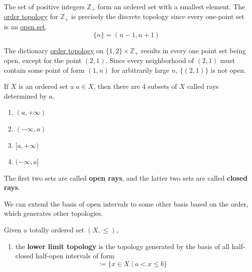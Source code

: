   \begin{example}
    \label{ex:positive-integers}
    The set of positive integers $\mathbb{Z}_+$ form an ordered set with a smallest element. The \hyperref[def:order-topology]{order topology} for $\mathbb{Z}_+$ is precisely the discrete topology since every one-point set is an \hyperref[def:open-set]{open set}. 
    \begin{equation}
      \{n\} = (n-1, n+1)
    \end{equation}
  \end{example}

  \begin{example}
    \label{ex:two-copies-of-positive-integers}
    The dictionary \hyperref[def:order-topology]{order topology} on $\{1, 2\} \times \mathbb{Z}_+$ results in every one point set being open, except for the point $(2, 1)$. Since every neighborhood of $(2,1)$ must contain some point of form $(1, n)$ for arbitrarily large $n$, $\{(2,1)\}$ is not open. 
  \end{example}

  \begin{definition}
    \label{def:open-and-closed-rays}
    If $X$ is an ordered set a $a \in X$, then there are 4 subsets of $X$ called rays determined by $a$. 
    \begin{enumerate}
      \item $(a, +\infty)$ 
      \item $(-\infty, a)$
      \item $[a, +\infty)$
      \item $(-\infty, a]$
    \end{enumerate}
    The first two sets are called \textbf{open rays}, and the latter two sets are called \textbf{closed rays}. 
  \end{definition}

  We can extend the basis of open intervals to some other basis based on the order, which generates other topologies. 

  \begin{example}
    \label{ex:lower-upper-limit-topology}
    Given a totally ordered set $(X, \leq)$, 
    \begin{enumerate}
      \item the \textbf{lower limit topology} is the topology generated by the basis of all half-closed half-open intervals of form 
      \begin{equation}
        [a, b) \coloneqq \{ x \in X \mid a \leq x < b \}
      \end{equation}
      \item the \textbf{upper limit topology} is the topology generated by the basis of all half-open half-closed intervals of form 
      \begin{equation}
        (a, b] \coloneqq \{ x \in X \mid a < x \leq b \}
      \end{equation}
    \end{enumerate}
  \end{example}

